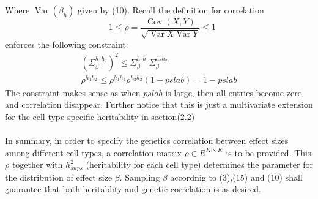 \documentclass{article}
\DeclareMathOperator{\Var}{Var}
\DeclareMathOperator{\Cov}{Cov}
\begin{document}
Where $\Var{(\beta_h)}$ given by (10). Recall the definition for correlation $$-1\leq \rho=\frac{\Cov{(X,Y)}}{\sqrt{\Var{X}\Var{Y}}} \leq1$$ enforces the following constraint:
\begin{gather*}
    (\Sigma^{h_1h_2}_{\beta})^2\le\Sigma^{h_1h_1}_{\beta}\Sigma^{h_2h_2}_{\beta}\\
    \rho^{h_1h_2}\le\rho^{h_1h_1}\rho^{h_2h_2}(1-pslab)=1-pslab
\end{gather*}
The constraint makes sense as when $pslab$ is large, then all entries become zero and correlation disappear. Further notice that this is just a multivariate extension for the cell type specific heritability in section(2.2)\\\\
In summary, in order to specify the genetics correlation between effect sizes among different cell types, a correlation matrix $\rho \in R^{K\times K}$ is to be provided. This $\rho$ together with $h^2_{snps}$ (heritability for each cell type) determines the parameter for the distribution of effect size $\beta$. Sampling $\beta$ accordnig to (3),(15) and (10) shall guarantee that both heritablity and genetic correlation is as desired.
\end{document}
